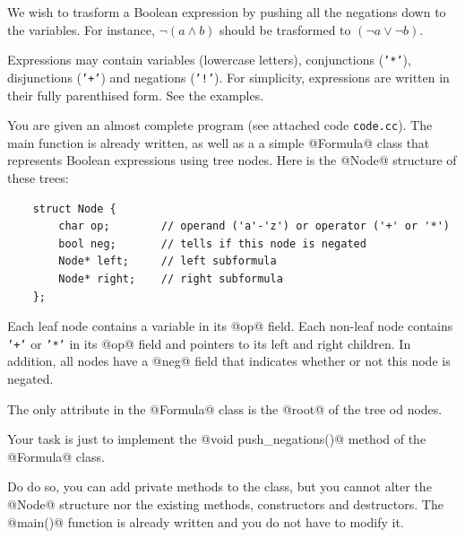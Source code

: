 \newcommand{\cert}{\textit{cert}}
\newcommand{\fals}{\textit{fals}}


\Statement


We wish to trasform a Boolean expression by pushing
all the negations down to the variables. For instance,
$\lnot(a\land b)$ should be trasformed to
$(\lnot a\lor \lnot b)$.

\medskip

Expressions may contain variables (lowercase letters), conjunctions
(\texttt{'*'}), disjunctions (\texttt{'+'}) and negations (\texttt{'!'}).
For simplicity, expressions are written in their fully parenthised form.
See the examples.

\medskip

You are given an almost complete program (see attached code \texttt{code.cc}).
The main function is already written, as well as a
a simple @Formula@ class that represents Boolean expressions
using tree nodes. Here is the @Node@ structure of these trees:

\begin{lstlisting}
    struct Node {
        char op;        // operand ('a'-'z') or operator ('+' or '*')
        bool neg;       // tells if this node is negated
        Node* left;     // left subformula
        Node* right;    // right subformula
    };
\end{lstlisting}

Each leaf node contains a variable in its @op@ field.
Each non-leaf node contains \texttt{'+'} or \texttt{'*'} in its @op@ field
and pointers to its left and right children. In addition, all nodes have a @neg@
field that indicates whether or not this node is negated.

\medskip

The only attribute in the @Formula@ class is the @root@ of the tree od nodes.

\medskip

Your task is just to implement the @void push_negations()@ method of the @Formula@
class.

\medskip

Do do so, you can add private methods to the class, but you cannot alter the
@Node@ structure nor the existing methods, constructors and destructors. The
@main()@ function is already written and you do not have to modify it.

\Sample

